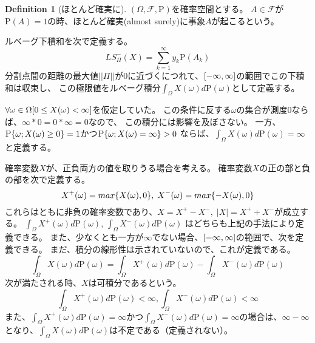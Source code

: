 \documentclass{ltjsarticle}
\numberwithin{equation}{subsection}
\theoremstyle{definition}
\newtheorem{dfn}{Definition}[subsection]
\begin{document}
\begin{dfn}[ほとんど確実に]
    $(\Omega , \mathcal{F} , \mathrm{P})$を確率空間とする。
    $A \in \mathcal{F}$が$\mathrm{P}(A)=1$の時、ほとんど確実(almost surely)に事象$A$が起こるという。
\end{dfn}


ルベーグ下積和を次で定義する。
\begin{equation}
    LS_{\Pi}^{-}(X) = \sum_{k=1}^{\infty} y_k \mathrm{P} (A_k)
\end{equation}
分割点間の距離の最大値$||\Pi||$が0に近づくにつれて、$\qty[-\infty , \infty]$の範囲でこの下積和は収束し、
この極限値をルベーグ積分$\int_{\Omega} X(\omega) d \mathrm{P}(\omega)$として定義する。


$\forall \omega \in \Omega \qty[0 \leq X(\omega) < \infty]$を仮定していた。
この条件に反する$\omega$の集合が測度0ならば、$\infty * 0 = 0 * \infty = 0$なので、
この積分には影響を及ぼさない。
一方、$\mathrm{P} \qty{\omega ; X(\omega) \geq 0} = 1$かつ$\mathrm{P} \qty{\omega ; X(\omega) = \infty} >0$
ならば、$\int_{\Omega} X(\omega) d \mathrm{P}(\omega)= \infty$と定義する。


確率変数$X$が、正負両方の値を取りうる場合を考える。
確率変数$X$の正の部と負の部を次で定義する。
\begin{equation}
    X^+ \qty(\omega) = max \qty{X(\omega), 0}, \; X^- (\omega) = max \qty{ -X(\omega), 0}
\end{equation}
これらはともに非負の確率変数であり、$X=X^+ - X^-, \; |X| = X^+ + X^-$が成立する。
$\int_{\Omega} X^+(\omega) d \mathrm{P}(\omega)$, $\int_{\Omega} X^-(\omega) d \mathrm{P}(\omega)$
はどちらも上記の手法により定義できる。
また、少なくとも一方が$\infty$でない場合、$\qty[-\infty , \infty]$の範囲で、次を定義できる。
まだ、積分の線形性は示されていないので、これが定義である。
\begin{equation}
    \label{dfn:L-integral}
    \int_{\Omega} X(\omega) d \mathrm{P}(\omega) = \int_{\Omega} X^+ (\omega) d \mathrm{P}(\omega) - \int_{\Omega} X^-(\omega) d \mathrm{P} (\omega)
\end{equation}
次が満たされる時、$X$は可積分であるという。
\begin{equation}
    \int_{\Omega} X^+ (\omega) d \mathrm{P}(\omega) < \infty, \int_{\Omega} X^-(\omega) d \mathrm{P} (\omega) < \infty
\end{equation}
また、$\int_{\Omega} X^+(\omega) d \mathrm{P}(\omega) = \infty$かつ$\int_{\Omega} X^-(\omega) d \mathrm{P}(\omega) = \infty$の場合は、$\infty - \infty$となり、$\int_{\Omega} X(\omega) d \mathrm{P}(\omega)$は不定である（定義されない）。
\end{document}
